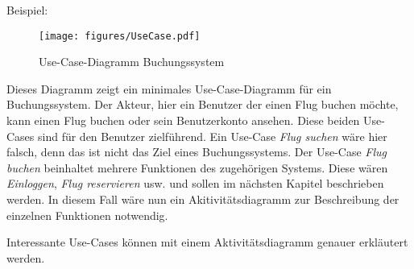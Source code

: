 Beispiel:

\begin{figure}[ht]
\centering
\texttt{[image: figures/UseCase.pdf]}
\caption{Use-Case-Diagramm Buchungssystem}
\end{figure}

Dieses Diagramm zeigt ein minimales Use-Case-Diagramm für ein Buchungssystem.
Der Akteur, hier ein Benutzer der einen Flug buchen möchte, kann einen Flug buchen oder
sein Benutzerkonto ansehen. Diese beiden Use-Cases sind für den Benutzer zielführend.
Ein Use-Case \emph{Flug suchen} wäre hier falsch, denn das ist nicht das Ziel eines Buchungssystems. 
Der Use-Case \emph{Flug buchen} beinhaltet mehrere Funktionen des zugehörigen Systems. 
Diese wären \emph{Einloggen}, \emph{Flug reservieren} usw. und sollen im nächsten Kapitel beschrieben werden. 
In diesem Fall wäre nun ein Akitivitätsdiagramm zur Beschreibung der einzelnen Funktionen notwendig. 


Interessante Use-Cases können mit einem Aktivitätsdiagramm genauer erkläutert werden.

